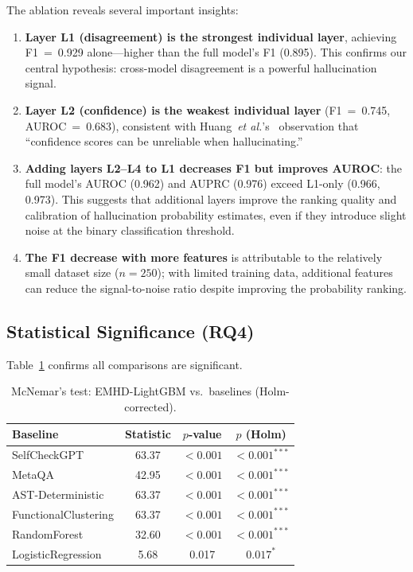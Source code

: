 \documentclass[runningheads]{llncs}
\newcommand{\etal}{\textit{et al.}}
\begin{document}
The ablation reveals several important insights:
\begin{enumerate}
\item \textbf{Layer L1 (disagreement) is the strongest individual layer}, achieving F1~=~0.929 alone---higher than the full model's F1 (0.895). This confirms our central hypothesis: cross-model disagreement is a powerful hallucination signal.
\item \textbf{Layer L2 (confidence) is the weakest individual layer} (F1~=~0.745, AUROC~=~0.683), consistent with Huang~\etal's~\cite{huang2025survey} observation that ``confidence scores can be unreliable when hallucinating.''
\item \textbf{Adding layers L2--L4 to L1 decreases F1 but improves AUROC}: the full model's AUROC (0.962) and AUPRC (0.976) exceed L1-only (0.966, 0.973). This suggests that additional layers improve the ranking quality and calibration of hallucination probability estimates, even if they introduce slight noise at the binary classification threshold.
\item \textbf{The F1 decrease with more features} is attributable to the relatively small dataset size ($n=250$); with limited training data, additional features can reduce the signal-to-noise ratio despite improving the probability ranking.
\end{enumerate}

\subsection{Statistical Significance (RQ4)}

Table~\ref{tab:significance} confirms all comparisons are significant.

\begin{table}[t]
\centering
\caption{McNemar's test: EMHD-LightGBM vs.\ baselines (Holm-corrected).}
\label{tab:significance}
\begin{tabular}{lccc}
\toprule
\textbf{Baseline} & \textbf{Statistic} & \textbf{$p$-value} & \textbf{$p$ (Holm)} \\
\midrule
SelfCheckGPT          & 63.37 & $<0.001$ & $<0.001^{***}$ \\
MetaQA                & 42.95 & $<0.001$ & $<0.001^{***}$ \\
AST-Deterministic     & 63.37 & $<0.001$ & $<0.001^{***}$ \\
FunctionalClustering  & 63.37 & $<0.001$ & $<0.001^{***}$ \\
RandomForest          & 32.60 & $<0.001$ & $<0.001^{***}$ \\
LogisticRegression    &  5.68 & 0.017   & $0.017^{*}$  \\
\bottomrule
\end{tabular}
\end{table}
\end{document}
